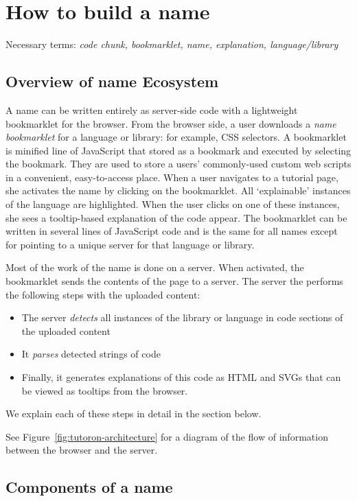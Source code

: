 \section{How to build a \gls{name}}

Necessary terms: \emph{code chunk, bookmarklet, \gls{name}, explanation, language/library}

\subsection{Overview of \gls{name} Ecosystem}

A \gls{name} can be written entirely as server-side code with a lightweight bookmarklet for the browser.
From the browser side, a user downloads a \emph{\gls{name} bookmarklet} for a language or library: for example, CSS selectors.
A bookmarklet is minified line of JavaScript that stored as a bookmark and executed by selecting the bookmark.
They are used to store a users' commonly-used custom web scripts in a convenient, easy-to-access place.
When a user navigates to a tutorial page, she activates the \gls{name} by clicking on the bookmarklet.
All `explainable' instances of the language are highlighted.
When the user clicks on one of these instances, she sees a tooltip-based explanation of the code appear.
The bookmarklet can be written in several lines of JavaScript code and is the same for all \glspl{name} except for pointing to a unique server for that language or library.

Most of the work of the \gls{name} is done on a server.
When activated, the bookmarklet sends the contents of the page to a server.
The server the performs the following steps with the uploaded content:
\begin{itemize}
\item The server \emph{detects} all instances of the library or language in code sections of the uploaded content
\item It \emph{parses} detected strings of code
\item Finally, it generates explanations of this code as HTML and SVGs that can be viewed as tooltips from the browser.
\end{itemize}
We explain each of these steps in detail in the section below.

See Figure~\ref{fig:tutoron-architecture} for a diagram of the flow of information between the browser and the server.

\subsection{Components of a \gls{name}}


